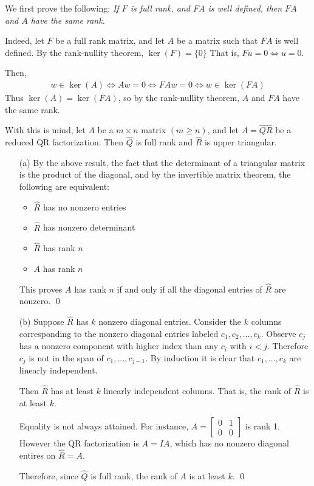 \documentclass[10pt]{article}
\begin{document}
\begin{solution}[Solution]
We first prove the following: \textit{If \( F \) is full rank, and \( FA \) is well defined, then \( FA \) and \( A \) have the same rank.}

Indeed, let \( F \) be a full rank matrix, and let \( A \) be a matrix such that \( FA \) is well defined. By the rank-nullity theorem,  \( \ker(F)=\{0\} \) That is, \( Fu=0 \Leftrightarrow u=0 \). 

Then, 
\begin{align*}
    w\in\ker(A) \Leftrightarrow Aw=0 \Leftrightarrow FAw=0 \Leftrightarrow w\in\ker(FA)
\end{align*}
Thus \( \ker(A) = \ker(FA) \), so by the rank-nullity theorem, \( A \) and \( FA \) have the same rank.

With this is mind, let \( A \) be a \( m\times n \) matrix \( (m\geq n) \), and let \( A=\hat{Q}\hat{R} \) be a reduced QR factorization. Then \( \hat{Q} \) is full rank and \( \hat{R} \) is upper triangular.

\begin{enumerate}
    \item[(a)] By the above result, the fact that the determinant of a triangular matrix is the product of the diagonal, and by the invertible matrix theorem, the following are equivalent:
        \begin{itemize}[nolistsep]
           \item \( \hat{R} \) has no nonzero entries
           \item\( \hat{R} \) has nonzero determinant 
           \item \( \hat{R} \) has rank \( n \) 
           \item \( A \) has rank \( n \) 
        \end{itemize}
        This proves \( A \) has rank \( n \) if and only if all the diagonal entries of \( \hat{R} \) are nonzero. \qed    
    \item[(b)] Suppose \( \hat{R} \) has \( k \) nonzero diagonal entries. Consider the \( k \) columns corresponding to the nonzero diagonal entries labeled \( c_1, c_2, ..., c_k \). Observe \( c_j \) has a nonzero component with higher index than any \( c_i \) with \( i<j \). Therefore \( c_j \) is not in the span of \( c_1, ..., c_{j-1} \). By induction it is clear that \( c_1, ..., c_k \) are linearly independent.

        Then \( \hat{R} \) has at least \( k \) linearly independent columns. That is, the rank of \( \hat{R} \) is at least \( k \).

        Equality is not always attained. For instance, \( A=\left[\begin{array}{cc}0 & 1\\0 & 0\end{array}\right] \) is rank 1. However the QR factorization is \( A=IA \), which has no nonzero diagonal entires on \( \hat{R}=A \).

       Therefore, since \( \hat{Q} \) is full rank, the rank of \( A \) is at least \( k \). \qed
\end{enumerate}

\end{solution}
\end{document}
